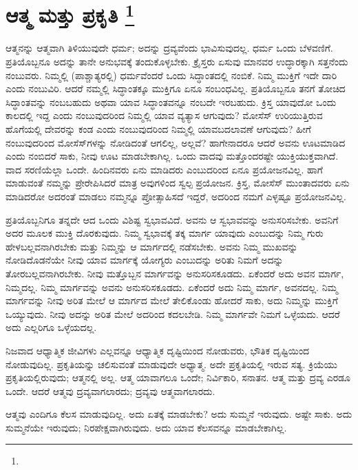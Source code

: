 
\chapter[ಆತ್ಮ ಮತ್ತು ಪ್ರಕೃತಿ ]{ಆತ್ಮ ಮತ್ತು ಪ್ರಕೃತಿ \protect\footnote{}}

ಆತ್ಮನನ್ನು ಆತ್ಮವಾಗಿ ತಿಳಿಯುವುದೇ ಧರ್ಮ; ಅದನ್ನು ದ್ರವ್ಯವೆಂದು ಭಾವಿಸುವುದಲ್ಲ. ಧರ್ಮ ಒಂದು ಬೆಳವಣಿಗೆ. ಪ್ರತಿಯೊಬ್ಬನೂ ಅದನ್ನು ತಾನೇ ಅನುಭವಕ್ಕೆ ತಂದುಕೊಳ್ಳಬೇಕು. ಕ್ರೈಸ್ತರು ಏಸುವು ಮಾನವರ ಉದ್ಧಾರಕ್ಕಾಗಿ ಸತ್ತನೆಂದು ನಂಬುವರು. ನಿಮ್ಮಲ್ಲಿ (ಪಾಶ್ಚಾತ್ಯರಲ್ಲಿ) ಧರ್ಮವೆಂದರೆ ಒಂದು ಸಿದ್ಧಾಂತದಲ್ಲಿ ನಂಬಿಕೆ. ನಿಮ್ಮ ಮುಕ್ತಿಗೆ ಇದೇ ದಾರಿ ಎಂದು ನಂಬುವಿರಿ. ಆದರೆ ನಮ್ಮಲ್ಲಿ ಸಿದ್ಧಾಂತಕ್ಕೂ ಮುಕ್ತಿಗೂ ಏನೂ ಸಂಬಂಧವಿಲ್ಲ. ಪ್ರತಿಯೊಬ್ಬನೂ ತನಗೆ ತೋಚಿದ ಸಿದ್ಧಾಂತವನ್ನು ನಂಬಬಹುದು ಅಥವಾ ಯಾವ ಸಿದ್ಧಾಂತವನ್ನೂ ನಂಬದೇ ಇರಬಹುದು. ಕ್ರಿಸ್ತ ಯಾವುದೋ ಒಂದು ಕಾಲದಲ್ಲಿ ಇದ್ದ ಎಂದು ನಂಬುವುದರಿಂದ ನಿಮ್ಮಲ್ಲಿ ಯಾವ ವ್ಯತ್ಯಾಸ ಆಗುವುದು? ಮೋಸೆಸ್​ ಉರಿಯುತ್ತಿರುವ ಹೊಗೆಯಲ್ಲಿ ದೇವರನ್ನು ಕಂಡ ಎಂದು ನಂಬುವುದರಿಂದ ನಿಮ್ಮಲ್ಲಿ ಯಾವ\break ಬದಲಾವಣೆ ಆಗುವುದು? ಹೀಗೆ ನಂಬುವುದರಿಂದ ಮೋಸೆಸ್​ಗಳನ್ನು ನೋಡಿದಂತೆ ಆಗಲಿಲ್ಲ, ಅಲ್ಲವೆ? ಹಾಗೇನಾದರೂ ಆದರೆ ಅವನು ಊಟಮಾಡಿದ ಎಂದು ನಂಬಿದರೆ ಸಾಕು, ನೀವು ಊಟ ಮಾಡಬೇಕಾಗಿಲ್ಲ. ಒಂದು ವಾದವು ಮತ್ತೊಂದರಷ್ಟೇ ಯುಕ್ತಿಯುಕ್ತವಾಗಿದೆ. ವಾದ ಸರಣಿಯೆಲ್ಲಾ ಒಂದೇ. ಹಿಂದಿನವರು ಏನು ಮಾಡಿದರು ಎಂಬುದರಿಂದ ಏನೂ ಪ್ರಯೋಜನವಿಲ್ಲ. ಹಾಗೆ ಮಾಡುವಂತೆ ನಮ್ಮನ್ನು ಪ್ರೇರೇಪಿಸಿದರೆ ಮಾತ್ರ ಅವುಗಳಿಂದ ಸ್ವಲ್ಪ ಪ್ರಯೋಜನ. ಕ್ರಿಸ್ತ, ಮೋಸೆಸ್​ ಮುಂತಾದವರು ಏನು ಮಾಡಿದರೋ ಅದರಂತೆ ಮಾಡಲು ನಮ್ಮನ್ನೂ ಪ್ರೋತ್ಸಾಹಿಸದೆ ಇದ್ದರೆ, ಅದರಿಂದ ನಮಗೆ ಎಳ್ಳಷ್ಟೂ ಪ್ರಯೋಜನವಿಲ್ಲ.

ಪ್ರತಿಯೊಬ್ಬನಿಗೂ ತನ್ನದೇ ಆದ ಒಂದು ವಿಶಿಷ್ಟ ಸ್ವಭಾವವಿದೆ. ಅವನು ಆ ಸ್ವಭಾವವನ್ನು ಅನುಸರಿಸಬೇಕು. ಅವನಿಗೆ ಅದರ ಮೂಲಕ ಮುಕ್ತಿ ದೊರಕುವುದು. ನಿಮ್ಮ ಸ್ವಭಾವಕ್ಕೆ ತಕ್ಕ ಮಾರ್ಗ ಯಾವುದು ಎಂಬುದನ್ನು ನಿಮ್ಮ ಗುರು ಹೇಳಬಲ್ಲವನಾಗಿರಬೇಕು ಮತ್ತು ನಿಮ್ಮನ್ನು ಆ ಮಾರ್ಗದಲ್ಲಿ ನಡೆಸಬೇಕು. ಅವನು ನಿಮ್ಮ ಮುಖವನ್ನು ನೋಡಿದೊಡನೆಯೇ ನೀವು ಯಾವ ಮಾರ್ಗಕ್ಕೆ ಯೋಗ್ಯರು ಎಂಬುದನ್ನು ಅರಿತು ನಿಮಗೆ ಅದನ್ನು ತೋರಬಲ್ಲವನಾಗಿರಬೇಕು. ನೀವು ಮತ್ತೊಬ್ಬನ ಮಾರ್ಗವನ್ನು ಅನುಸರಿಸಕೂಡದು. ಏಕೆಂದರೆ ಅದು ಅವನ ಮಾರ್ಗ, ನಿಮ್ಮದಲ್ಲ. ನಿಮ್ಮ ಮಾರ್ಗವನ್ನು ಅವನು ಅನುಸರಿಸಕೂಡದು. ಏಕೆಂದರೆ ಅದು ನಿಮ್ಮ ಮಾರ್ಗ, ಅವನದಲ್ಲ. ನಿಮ್ಮ ಮಾರ್ಗವನ್ನು ನೀವು ಅರಿತ ಮೇಲೆ ಆ ಮಾರ್ಗದ ಮೇಲೆ ತೇಲಿಕೊಂಡು ಹೋದರೆ ಸಾಕು, ಅದು ನಿಮ್ಮನ್ನು ಮುಕ್ತಿಗೆ ಒಯ್ಯುವುದು. ನೀವು ಅದನ್ನು ಅರಿತ ಮೇಲೆ ಅದರಿಂದ ಕದಲಬೇಡಿ. ನಿಮ್ಮ ಮಾರ್ಗವೇ ನಿಮಗೆ ಒಳ್ಳೆಯದು. ಆದರೆ ಅದು ಎಲ್ಲರಿಗೂ ಒಳ್ಳೆಯದಲ್ಲ.

ನಿಜವಾದ ಆಧ್ಯಾತ್ಮಿಕ ಜೀವಿಗಳು ಎಲ್ಲವನ್ನೂ ಆಧ್ಯಾತ್ಮಿಕ ದೃಷ್ಟಿಯಿಂದ ನೋಡುವರು, ಭೌತಿಕ ದೃಷ್ಟಿಯಿಂದ ನೋಡುವುದಿಲ್ಲ. ಪ್ರಕೃತಿಯನ್ನು ಚಲಿಸುವಂತೆ ಮಾಡುವುದೇ ಅಧ್ಯಾತ್ಮ. ಅದೇ ಪ್ರಕೃತಿಯಲ್ಲಿ ಇರುವ ಸತ್ಯ. ಕ್ರಿಯೆಯು ಪ್ರಕೃತಿಯಲ್ಲಿರುವುದು; ಆತ್ಮನಲ್ಲಿ ಅಲ್ಲ. ಆತ್ಮ ಯಾವಾಗಲೂ ಒಂದೇ; ನಿರ್ವಿಕಾರಿ, ಸನಾತನ. ಆತ್ಮ ಮತ್ತು ದ್ರವ್ಯ ಎರಡೂ ಒಂದೇ. ಆದರೆ ಆತ್ಮವು ದ್ರವ್ಯವಾಗಲಾರದು; ದ್ರವ್ಯವು ಆತ್ಮವಾಗಲಾರದು.

ಆತ್ಮವು ಎಂದಿಗೂ ಕೆಲಸ ಮಾಡುವುದಿಲ್ಲ. ಅದು ಏತಕ್ಕೆ ಮಾಡಬೇಕು? ಅದು ಸುಮ್ಮನೆ ಇರುವುದು. ಅಷ್ಟೇ ಸಾಕು. ಅದು ಸುಮ್ಮನೆಯೇ ಇರುವುದು; ನಿರಪೇಕ್ಷವಾಗಿರುವುದು. ಅದು ಯಾವ ಕೆಲಸವನ್ನೂ ಮಾಡಬೇಕಾಗಿಲ್ಲ.

